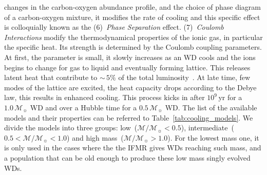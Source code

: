 \documentclass[fleqn,usenatbib]{rasti}
\newcommand{\msun}{\mathcal{M}_{\sun}}
\begin{document}
changes in the carbon-oxygen abundance profile, and the choice of phase
diagram of a carbon-oxygen mixture, it modifies the rate of cooling and this
specific effect is colloquially known as the (6)~\textit{Phase Separation}
effect. (7)~\textit{Coulomb Interactions} modify the thermodynamical
properties of the ionic gas, in particular the specific heat. Its strength is
determined by the Coulomb coupling parameters. At first, the parameter is
small, it slowly increases as an WD cools and the ions begins to change for
gas to liquid and eventually forming lattice. This releases latent heat that
contribute to $\sim$\,$5\%$ of the total luminosity~\citep{1976A&A....51..383S}.
At late time, few modes of the lattice are excited, the heat capacity drops
according to the Debye law, this results in enhanced cooling. This process
kicks in after $10^9$\,yr for a $1.0\,\msun$ WD and over a Hubble time for a
$0.5\,\msun$ WD. The list of the available models and their properties can be
referred to Table~\ref{tab:cooling_models}. We divide the models into three
groups: low~($\mathcal{M}/\msun < 0.5$),
intermediate~($0.5 < \mathcal{M}/\msun < 1.0$) and
high mass~($\mathcal{M}/\msun > 1.0$). For the lowest mass one, it is only
used in the cases where the the IFMR gives WDs reaching such mass, and a
population that can be old enough to produce these low mass singly evolved
WDs.
\end{document}
